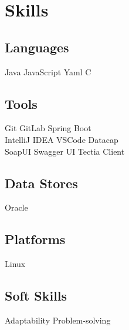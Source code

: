 \documentclass[]{deedy-resume-openfont}
\begin{document}
%
%

%
%

%
%

\begin{minipage}[t]{0.33\textwidth} 


\section{Skills}
\subsection{Languages}
Java \textbullet{} JavaScript \textbullet{} Yaml \textbullet{} C




\subsection{Tools}
Git \textbullet{} GitLab \textbullet{} Spring Boot  \\ \textbullet{} IntelliJ IDEA \textbullet{} VSCode  \textbullet{} Datacap \\ \textbullet{} SoapUI \textbullet{}  Swagger UI \textbullet{}  Tectia Client
\sectionsep

\subsection{Data Stores}
Oracle  
\sectionsep

\subsection{Platforms}
Linux  
\sectionsep

\subsection{Soft Skills}
 Adaptability \textbullet{} Problem-solving
\sectionsep


\end{minipage}
\end{document}
